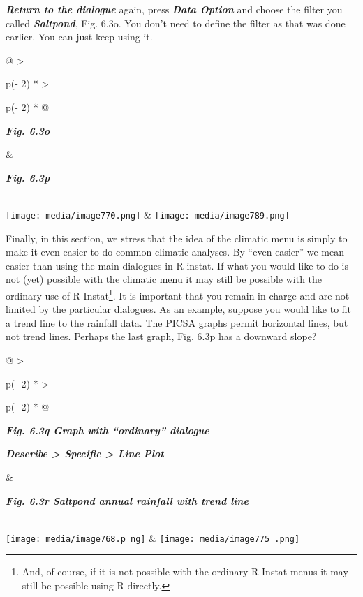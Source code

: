 \documentclass[
  letterpaper,
  DIV=11,
  numbers=noendperiod]{scrreprt}
\begin{document}
\textbf{\emph{Return to the dialogue}} again, press \textbf{\emph{Data
Option}} and choose the filter you called \textbf{\emph{Saltpond}}, Fig.
6.3o. You don't need to define the filter as that was done earlier. You
can just keep using it.

\begin{longtable}[]{@{}
  >{\raggedright\arraybackslash}p{(\columnwidth - 2\tabcolsep) * }
  >{\raggedright\arraybackslash}p{(\columnwidth - 2\tabcolsep) * }@{}}
\toprule\noalign{}
\begin{minipage}[b]{\linewidth}\raggedright
\textbf{\emph{Fig. 6.3o}}
\end{minipage} & \begin{minipage}[b]{\linewidth}\raggedright
\textbf{\emph{Fig. 6.3p}}
\end{minipage} \\
\midrule\noalign{}
\endhead
\bottomrule\noalign{}
\endlastfoot
\texttt{[image: media/image770.png]} &
\texttt{[image: media/image789.png]} \\
\end{longtable}

Finally, in this section, we stress that the idea of the climatic menu
is simply to make it even easier to do common climatic analyses. By
``even easier'' we mean easier than using the main dialogues in
R-instat. If what you would like to do is not (yet) possible with the
climatic menu it may still be possible with the ordinary use of
R-Instat\footnote{And, of course, if it is not possible with the
  ordinary R-Instat menus it may still be possible using R directly.}.
It is important that you remain in charge and are not limited by the
particular dialogues. As an example, suppose you would like to fit a
trend line to the rainfall data. The PICSA graphs permit horizontal
lines, but not trend lines. Perhaps the last graph, Fig. 6.3p has a
downward slope?

\begin{longtable}[]{@{}
  >{\raggedright\arraybackslash}p{(\columnwidth - 2\tabcolsep) * }
  >{\raggedright\arraybackslash}p{(\columnwidth - 2\tabcolsep) * }@{}}
\toprule\noalign{}
\begin{minipage}[b]{\linewidth}\raggedright
\textbf{\emph{Fig. 6.3q Graph with ``ordinary'' dialogue}}

\textbf{\emph{Describe \textgreater{} Specific \textgreater{} Line
Plot}}
\end{minipage} & \begin{minipage}[b]{\linewidth}\raggedright
\textbf{\emph{Fig. 6.3r Saltpond annual rainfall with trend line}}
\end{minipage} \\
\midrule\noalign{}
\endhead
\bottomrule\noalign{}
\endlastfoot
\texttt{[image: media/image768.p ng]}
&
\texttt{[image: media/image775 .png]} \\
\end{longtable}
\end{document}
